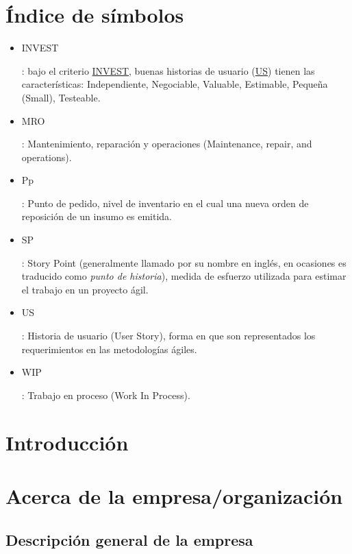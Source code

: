 \documentclass[a4paper, 12pt,twoside]{report}  %
\numberwithin{equation}{subsection} %
\begin{document}
\chapter*{Índice de símbolos}
\begin{itemize}
\item \hypertarget{INVEST}{INVEST}: bajo el criterio \hyperlink{INVEST}{INVEST}, buenas historias de usuario (\hyperlink{US}{US}) tienen las características: Independiente, Negociable, Valuable, Estimable, Pequeña (Small), Testeable.
\item \hypertarget{MRO}{MRO}: Mantenimiento, reparación y operaciones (Maintenance, repair, and operations).
\item \hypertarget{Pp}{Pp}: Punto de pedido, nivel de inventario en el cual una nueva orden de reposición de un insumo es emitida.
\item \hypertarget{SP}{SP}: Story Point (generalmente llamado por su nombre en inglés, en ocasiones es traducido como \textit{punto de historia}), medida de esfuerzo utilizada para estimar el trabajo en un proyecto ágil.
\item \hypertarget{US}{US}: Historia de usuario (User Story), forma en que son representados los requerimientos en las metodologías ágiles.
\item \hypertarget{WIP}{WIP}: Trabajo en proceso (Work In Process).
\end{itemize}

\renewcommand{\listfigurename}{Índice de figuras}
\listoffigures
{}

\renewcommand{\listtablename}{Índice de tablas}
\listoftables
{}

\clearpage

\chapter{Introducción}

\chapter{Acerca de la empresa/organización}
\section{Descripción general de la empresa}
\end{document}
